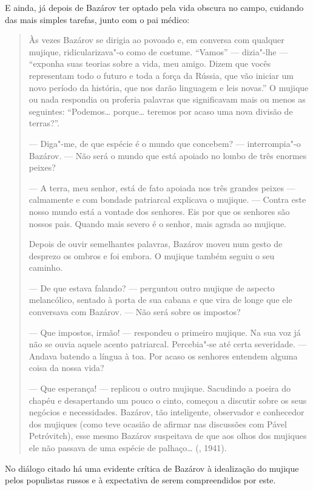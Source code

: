 E ainda, já depois de Bazárov ter optado pela vida obscura no campo, cuidando das mais simples tarefas, junto com o pai médico:

\begin{quotation}
Às vezes Bazárov se dirigia ao povoado e, em conversa com qualquer mujique, ridicularizava"-o como de costume. ``Vamos'' --- dizia"-lhe --- ``exponha suas teorias sobre a vida, meu amigo. Dizem que vocês representam todo o futuro e toda a força da Rússia, que vão iniciar um novo período da história, que nos darão linguagem e leis novas.'' O mujique ou nada respondia ou proferia palavras que significavam mais ou menos as seguintes: ``Podemos\ldots{} porque\ldots{} teremos por acaso uma nova divisão
de terras?''.

--- Diga"-me, de que espécie é o mundo que concebem? ---
interrompia"-o Bazárov. --- Não será o mundo que está apoiado no
lombo de três enormes peixes?

--- A terra, meu senhor, está de fato apoiada nos três grandes peixes --- calmamente e com bondade patriarcal explicava o mujique. --- Contra este nosso mundo está a vontade dos senhores. Eis por que os senhores são nossos pais. Quando mais severo é o senhor, mais agrada ao mujique.

Depois de ouvir semelhantes palavras, Bazárov moveu num gesto de
desprezo os ombros e foi embora. O mujique também seguiu o seu caminho.

--- De que estava falando? --- perguntou outro mujique de aspecto melancólico, sentado à porta de sua cabana e que vira de longe
que ele conversava com Bazárov. --- Não será sobre os impostos?

--- Que impostos, irmão! --- respondeu o primeiro mujique. Na sua voz já não se ouvia aquele acento patriarcal. Percebia"-se até certa severidade. --- Andava batendo a língua à toa. Por acaso os senhores entendem alguma coisa da nossa vida?

--- Que esperança! --- replicou o outro mujique. Sacudindo a poeira do chapéu e desapertando um pouco o cinto, começou a discutir sobre os seus negócios e necessidades. Bazárov, tão inteligente, observador e conhecedor dos mujiques (como teve ocasião de afirmar nas discussões com Pável Petróvitch), esse mesmo Bazárov suspeitava de que aos olhos dos mujiques ele não passava de uma espécie de palhaço\ldots{} (, 1941).
\end{quotation}

No diálogo citado há uma evidente crítica de Bazárov à idealização do
mujique pelos populistas russos e à expectativa de serem compreendidos por este.

